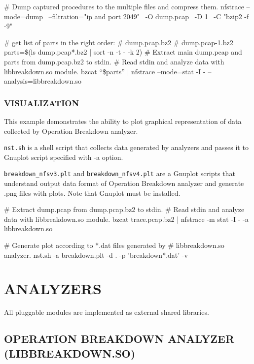 \documentclass{article}
\newcommand{\code}[1]{\texttt{#1}}
\begin{document}
\begin{CodeListing}
\# Dump captured procedures to the multiple files and compress them. 
nfstrace --mode=dump \
         --filtration="ip and port 2049" \
         -O dump.pcap \
         -D 1 \
         -C "bzip2 -f -9"

\# get list of parts in the right order:
\#    dump.pcap.bz2
\#    dump.pcap-1.bz2
parts=\$(ls dump.pcap*.bz2 | sort -n -t - -k 2)
\# Extract main dump.pcap and parts from dump.pcap.bz2 to stdin.
\# Read stdin and analyze data with libbreakdown.so module. 
bzcat “\$parts” | nfstrace --mode=stat
-I -
--analysis=libbreakdown.so
\end{CodeListing}

\subsubsection{VISUALIZATION}
\label{sec:visualization}

This example demonstrates the ability to plot graphical representation of data
collected by Operation Breakdown analyzer.

\code{nst.sh} is a shell script that collects data generated by analyzers and
passes it to \gls{Gnuplot} script specified with -a option.  

\code{breakdown\_nfsv3.plt} and \code{breakdown\_nfsv4.plt} are a \gls{Gnuplot}
scripts that understand output data format of Operation Breakdown analyzer and
generate .png files with plots.  Note that \gls{Gnuplot} must be installed.

\begin{minipage}[t]{\linewidth}
\begin{CodeListing}
# Extract dump.pcap from dump.pcap.bz2 to stdin.
# Read stdin and analyze data with libbreakdown.so module. 
bzcat trace.pcap.bz2 | nfstrace -m stat -I - -a libbreakdown.so

# Generate plot according to *.dat files generated by
# libbreakdown.so analyzer. 
nst.sh -a breakdown.plt -d . -p 'breakdown*.dat' -v
\end{CodeListing} 
\end{minipage}

\section{ANALYZERS}

All pluggable modules are implemented as external shared libraries.

\subsection{OPERATION BREAKDOWN ANALYZER (LIBBREAKDOWN.SO)}
\end{document}

